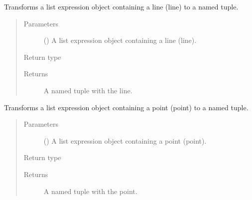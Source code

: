 \documentclass[letterpaper,10pt,english]{sphinxmanual}
\begin{document}

\begin{fulllineitems}
\label{\detokenize{index:secondodb.api.algebras.secondospatialalgebra.parse_line}}
Transforms a list expression object containing a line (line) to a named tuple.
\begin{quote}\begin{description}
\item[{Parameters}] \leavevmode
{} () \textendash{} A list expression object containing a line (line).

\item[{Return type}] \leavevmode
{\hyperref[\detokenize{index:secondodb.api.algebras.secondospatialalgebra.Line}]{}}

\item[{Returns}] \leavevmode
A named tuple with the line.

\end{description}\end{quote}

\end{fulllineitems}


\begin{fulllineitems}
\label{\detokenize{index:secondodb.api.algebras.secondospatialalgebra.parse_point}}
Transforms a list expression object containing a point (point) to a named tuple.
\begin{quote}\begin{description}
\item[{Parameters}] \leavevmode
{} () \textendash{} A list expression object containing a point (point).

\item[{Return type}] \leavevmode
{\hyperref[\detokenize{index:secondodb.api.algebras.secondospatialalgebra.Point}]{}}

\item[{Returns}] \leavevmode
A named tuple with the point.

\end{description}\end{quote}

\end{fulllineitems}
\end{document}
